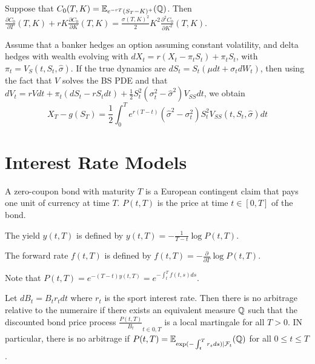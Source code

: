 \begin{thm}
  \label{sec:hedg-cont-claims-4}
  Suppose that $C_{0}(T, K) = \E{\Q}{e^{-rT}(S_{T} - K)^{+}}$.  Then
  $\frac{\partial C_{0}}{\partial T}(T, K) + rK \frac{\partial
    C_{0}}{\partial K}(T, K) = \frac{\sigma(T, K)^{2}}{2} K^{2}
  \frac{\partial^{2} C_{0}}{\partial K^{2}}(T, K)$.
\end{thm}

\begin{thm}
  Assume that a banker hedges an option assuming constant volatility,
  and delta hedges with wealth evolving with $dX_{t} = r(X_{t} -
  \pi_{t} S_{t}) + \pi_{t} S_{t}$, with $\pi_{t} = V_{S}(t, S_{t},
  \hat \sigma)$.  If the true dynamics are $dS_{t} = S_{t}(\mu dt +
  \sigma_{t} dW_{t})$, then using the fact that $V$ solves the BS PDE
  and that $dV_{t} = rV dt + \pi_{t}(dS_{t} - r S_{t} dt) +
  \frac{1}{2} S_{t}^{2}(\sigma_{t}^{2} - \hat \sigma^{2}) V_{SS} dt$,
  we obtain
  \begin{equation}
    \label{eq:32}
    X_{T} - g(S_{T}) = \frac{1}{2} \int_{0}^{T} e^{r(T-t)}(\hat
    \sigma^{2} - \sigma^{2}_{t}) S_{t}^{2} V_{SS}(t, S_{t}, \hat
    \sigma) dt
  \end{equation}
\end{thm}

\section{Interest Rate Models}
\label{sec:interest-rate-models}
\begin{defn}
  \label{sec:interest-rate-models-1}
  A zero-coupon bond with maturity $T$ is a European contingent claim
  that pays one unit of currency at time $T$.  $P(t, T)$ is the price
  at time $t \in [0, T]$ of the bond.

  The yield $y(t, T)$ is defined by $y(t, T) = - \frac{1}{T- t} \log
  P(t, T)$.

  The forward rate $f(t, T)$ is defined by $f(t, T) = -
  \frac{\partial}{\partial T} \log P(t, T)$.

  Note that $P(t, T) = e^{-(T-t) y(t, T)} = e^{-\int_{t}^{T} f(t, s)
    ds}$.
\end{defn}

\begin{thm}
  \label{sec:interest-rate-models-3}
  Let $dB_{t} = B_{t} r_{t} dt$ where $r_{t}$ is the sport interest
  rate.  Then there is no arbitrage relative to the numeraire if there
  exists an equivalent measure $\Q$ such that the discounted bond
  price process $\frac{P(t, T)}{B_{t}}_{t \in 0, T}$ is a local
  martingale for all $T > 0$.  IN particular, there is no arbitrage if
  $P(t, T) = \E{\Q}{\exp(-\int_{t}^{T} r_{s} ds) | \mathcal{F}_{t}}$
  for all $0 \leq t \leq T$.
\end{thm}

